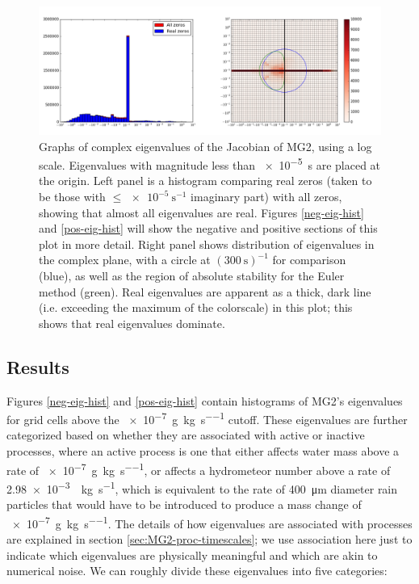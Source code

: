 \documentclass [11pt, proquest] {uwthesis}[2020/02/24]
\begin{document}
\begin{figure}[htbp]
  \includegraphics[width=6.5in]{./MG2Figure1.png}
  \caption[Graphs of complex eigenvalues of the Jacobian of MG2]{Graphs of complex eigenvalues of the Jacobian of MG2, using a log scale. Eigenvalues with magnitude less than \SI{e-5}{\second} are placed at the origin. Left panel is a histogram comparing real zeros (taken to be those with $\le \SI{e-5}{\second^{-1}}$ imaginary part) with all zeros, showing that almost all eigenvalues are real. Figures \ref{neg-eig-hist} and \ref{pos-eig-hist} will show the negative and positive sections of this plot in more detail. Right panel shows distribution of eigenvalues in the complex plane, with a circle at $(\SI{300}{\second})^{-1}$ for comparison (blue), as well as the region of absolute stability for the Euler method (green). Real eigenvalues are apparent as a thick, dark line (i.e. exceeding the maximum of the colorscale) in this plot; this shows that real eigenvalues dominate.}
  \label{complex-eigs}
\end{figure}

\subsection{Results}

\label{sec:timescales-results}

Figures \ref{neg-eig-hist} and \ref{pos-eig-hist} contain histograms of MG2's eigenvalues for grid cells above the \SI{e-7}{\gram\per\kilo\gram\per\second} cutoff. These eigenvalues are further categorized based on whether they are associated with active or inactive processes, where an active process is one that either affects water mass above a rate of \SI{e-7}{\gram\per\kilo\gram\per\second}, or affects a hydrometeor number above a rate of \SI{2.98e-3}{\per\kilo\gram\per\second}, which is equivalent to the rate of \SI{400}{\micro\meter} diameter rain particles that would have to be introduced to produce a mass change of \SI{e-7}{\gram\per\kilo\gram\per\second}. The details of how eigenvalues are associated with processes are explained in section \ref{sec:MG2-proc-timescales}; we use association here just to indicate which eigenvalues are physically meaningful and which are akin to numerical noise. We can roughly divide these eigenvalues into five categories:
\end{document}
